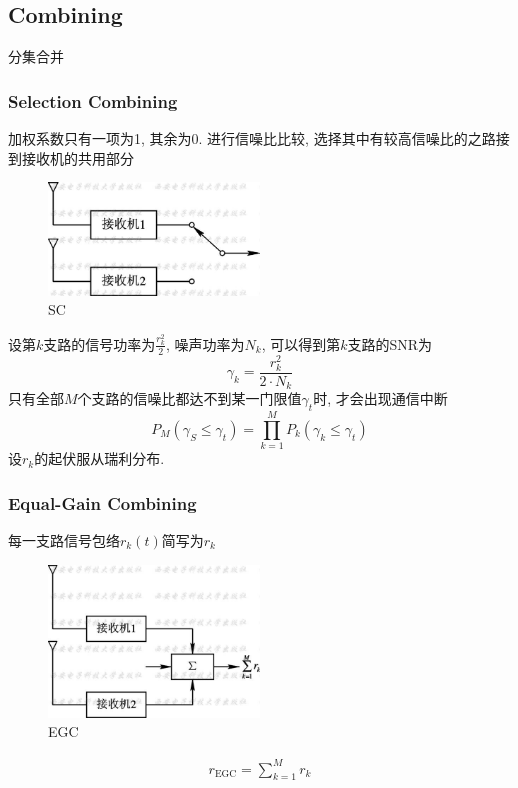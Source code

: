 \documentclass[a4paper]{report}
\begin{document}
\subsection{Combining}
分集合并
\subsubsection{Selection Combining}
加权系数只有一项为1, 其余为0. 进行信噪比比较, 选择其中有较高信噪比的之路接到接收机的共用部分
\begin{figure}[H]
\centering
\includegraphics[width=0.5\textwidth]{sc.jpg}
\caption{SC}
\end{figure}

设第$k$支路的信号功率为$\frac{r_k^2}{2}$, 噪声功率为$N_k$, 可以得到第$k$支路的SNR为
\begin{equation}
	\gamma_k=\frac{r_k^2}{2\cdot N_k}
\end{equation}
只有全部$M$个支路的信噪比都达不到某一门限值$\gamma_t$时, 才会出现通信中断
\begin{equation}
	P_M(\gamma_S\leq\gamma_t)=\prod_{k=1}^M P_k(\gamma_k\leq\gamma_t)
\end{equation}
设$r_k$的起伏服从瑞利分布. 

\subsubsection{Equal-Gain Combining}
每一支路信号包络$r_k(t)$简写为$r_k$
\begin{figure}[H]
\centering
\includegraphics[width=0.5\textwidth]{egc.jpg}
\caption{EGC}
\end{figure}

\begin{align*}
	r_{\text{EGC}}=\sum_{k=1}^M r_k
\end{align*}
\end{document}
